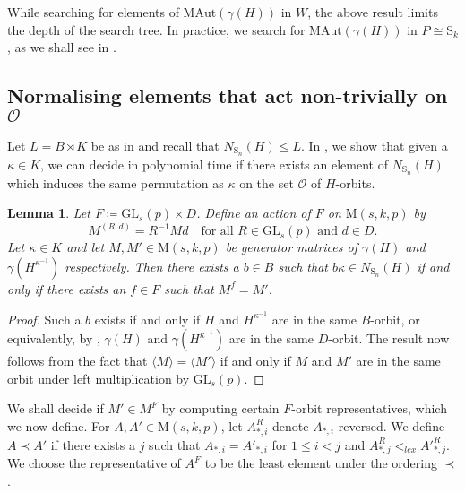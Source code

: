\documentclass[11pt,a4paper]{article}
\newtheorem{lemma}[theorem]{Lemma}
\theoremstyle{definition}
\theoremstyle{remark}
\newcommand{\MAut}{\mathrm{MAut}}
\newcommand{\Sy}{\mathrm{S}}
\begin{document}
While searching for elements of $\MAut(\gamma(H))$ in $W$, the above result limits the depth of the search tree. In practice, we search for $\MAut(\gamma(H))$ in $P \cong \Sy_k$, as we shall see in . 


\subsection{Normalising elements that act non-trivially on \texorpdfstring{$\mathcal{O}$}{O}}
\label{subsection: canon im}

Let $L = B  \rtimes K$ be as in  and recall that $N_{\Sy_n}(H) \leq L$. 
In , we show that given a $\kappa \in K$, we can decide in polynomial time if there exists an element of $N_{\Sy_n}(H)$ which induces the same permutation as $\kappa$ on the set $\mathcal{O}$ of $H$-orbits. 


\begin{lemma} \label{$w$ gives norm iff same semicanon}
Let $F  \coloneqq  \mathrm{GL}_s(p) \times D$.
Define an action of $F$ on $\mathrm{M}(s,k,p)$ by 
\[M^{(R,d)} = R^{-1}Md  \quad \text{for all $R \in \mathrm{GL}_s(p)$ and $d \in  D$}. \] 
Let $\kappa \in K$ and let $M, M' \in \mathrm{M}(s,k , p)$ be generator matrices of $\gamma(H)$ and $\gamma(H^{\kappa^{-1}})$ respectively. 
Then there exists a $b \in B$ such that $b \kappa \in N_{\Sy_n}(H)$ if and only if 
there exists an $f \in F$ such that $M^f = M'$.
\end{lemma}

\begin{proof}
Such a $b$ exists if and only if 
$H$ and $H^{\kappa^{-1}}$ are in the same $B$-orbit, or equivalently, by , $\gamma(H)$ and $\gamma(H^{\kappa^{-1}})$ are in the same $D$-orbit.  
The result now follows from the fact that $ \langle M \rangle = \langle M' \rangle$ if and only if $M$ and $M'$ are in the same orbit under left multiplication by $\mathrm{GL}_s(p)$. 
\end{proof}

We shall decide if $M' \in M^F$ by computing certain $F$-orbit representatives, which we now define. 
For $A, A' \in \mathrm{M}(s,k,p)$, let $A_{*,i}^R$ denote $A_{*,i}$ reversed. 
We define $A \prec A'$ if there exists a $j$ such that $A_{*,i} = A'_{*,i}$ for $1 \leq i < j$ and
$A_{*,j}^R <_{lex} {A'}_{*,j}^R$. 
We choose the representative of $A^F$ to be the least element under the ordering $\prec$.
\end{document}
